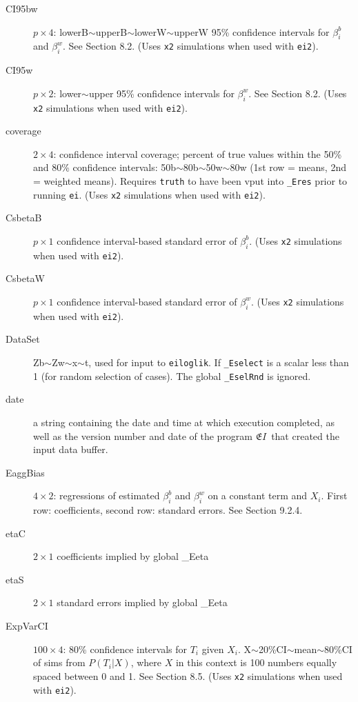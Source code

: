 \documentclass[11pt,titlepage]{article}
\newcommand{\EI}{\ensuremath{{\mathfrak EI}}}
\begin{document}
\begin{description}
\item[CI95bw] $p\times 4$: lowerB$\sim$upperB$\sim$lowerW$\sim$upperW
  95\% confidence intervals for $\beta_i^b$ and $\beta_i^w$.  See
  Section 8.2.  (Uses \texttt{x2} simulations when used
  with \texttt{ei2}).

\item[CI95w] $p\times 2$: lower$\sim$upper 95\% confidence intervals
  for $\beta_i^w$.  See Section 8.2.  (Uses \texttt{x2}
  simulations when used with \texttt{ei2}).

\item[coverage] $2\times 4$: confidence interval coverage; percent of
  true values within the 50\% and 80\% confidence intervals:
  50b$\sim$80b$\sim$50w$\sim$80w (1st row = means, 2nd = weighted
  means).  Requires \texttt{truth} to have been vput into
  \texttt{\_Eres} prior to running \texttt{ei}.  (Uses \texttt{x2}
  simulations when used with \texttt{ei2}).

\item[CsbetaB] $p\times 1$ confidence interval-based standard error of
  $\beta_i^b$.  (Uses \texttt{x2} simulations when used with
  \texttt{ei2}).

\item[CsbetaW] $p\times 1$ confidence interval-based standard error of
  $\beta_i^w$.  (Uses \texttt{x2} simulations when used with
  \texttt{ei2}).

\item[DataSet] Zb$\sim$Zw$\sim$x$\sim$t, used for input to
  \texttt{eiloglik}.  If \texttt{\_Eselect} is a scalar less than 1
  (for random selection of cases).  The global \texttt{\_EselRnd} is
  ignored.

\item[date] a string containing the date and time at which execution
  completed, as well as the version number and date of the program
  \EI\ that created the input data buffer.

\item[EaggBias] $4\times 2$: regressions of estimated $\beta_i^b$ and
  $\beta_i^w$ on a constant term and $X_i$.  First row: coefficients,
  second row: standard errors.  See Section 9.2.4.

\item[etaC] $2\times 1$ coefficients implied by global \_Eeta

\item[etaS] $2\times 1$ standard errors implied by global \_Eeta

\item[ExpVarCI] $100\times 4$: 80\% confidence intervals for $T_i$
  given $X_i$.  X$\sim$20\%CI$\sim$mean$\sim$80\%CI of sims from
  $P(T_i|X)$, where $X$ in this context is 100 numbers equally spaced
  between 0 and 1.  See Section 8.5.  (Uses \texttt{x2} simulations
  when used with \texttt{ei2}).


\end{description}
\end{document}
